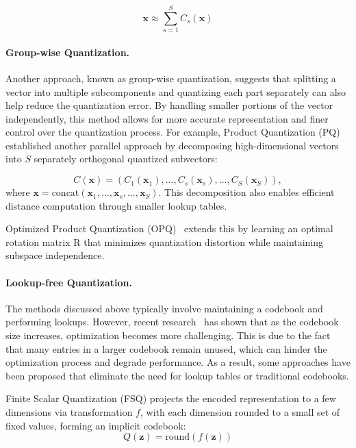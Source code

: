 \begin{equation}
\boldsymbol{x} \approx \sum_{s=1}^S C_s(\boldsymbol{x})
\end{equation}


\paragraph{Group-wise Quantization.}
Another approach, known as group-wise quantization, suggests that splitting a vector into multiple subcomponents and quantizing each part separately can also help reduce the quantization error. By handling smaller portions of the vector independently, this method allows for more accurate representation and finer control over the quantization process. 
For example, Product Quantization (PQ)~\cite{jegou2010product} established another parallel approach by decomposing high-dimensional vectors into $S$ separately orthogonal quantized subvectors:

\begin{equation}
C(\boldsymbol{x}) = (C_1(\boldsymbol{x}_1), ..., C_s(\boldsymbol{x}_s), ..., C_S(\boldsymbol{x}_S)),
\end{equation}
where $\boldsymbol{x} = \text{concat}(\boldsymbol{x}_1, ..., \boldsymbol{x}_s, ..., \boldsymbol{x}_S)$. This decomposition also enables efficient distance computation through smaller lookup tables. 

Optimized Product Quantization (OPQ)~\cite{ge2013optimized} extends this by learning an optimal rotation matrix R that minimizes quantization distortion while maintaining subspace independence. 

\paragraph{Lookup-free Quantization.}
The methods discussed above typically involve maintaining a codebook and performing lookups. However, recent research~\cite{yu2023magvit-v2} has shown that as the codebook size increases, optimization becomes more challenging. This is due to the fact that many entries in a larger codebook remain unused, which can hinder the optimization process and degrade performance.
As a result, some approaches have been proposed that eliminate the need for lookup tables or traditional codebooks. 

Finite Scalar Quantization (FSQ) \cite{mentzer2023fsq} projects the 
encoded representation to a few dimensions via transformation $f$, with each dimension rounded to a small set of fixed values, forming an implicit codebook:
\begin{equation}
    Q(\boldsymbol{z}) = \text{round}(f(\boldsymbol{z}))
\end{equation}

